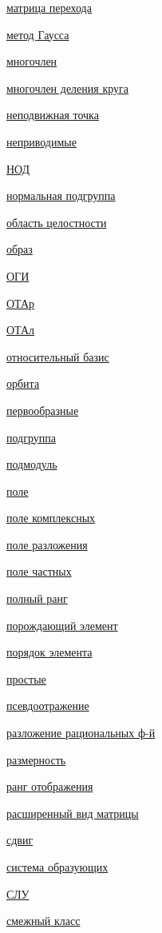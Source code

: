 \documentclass[a4paper,100pt]{article}
\theoremstyle{indented}
\theoremstyle{definition}
\theoremstyle{remark}
\begin{document}
\begin{multicols}{2}
    \hyperlink{n55}{матрица перехода}\

    \hyperlink{n60}{метод Гаусса}\

    \hyperlink{n27}{многочлен}\

    \hyperlink{n93}{многочлен деления круга}\

    \hyperlink{n72}{неподвижная точка}\

    \hyperlink{n7}{неприводимые}\

    \hyperlink{n6}{НОД}\

    \hyperlink{n87}{нормальная подгруппа}\

    \hyperlink{n2}{область целостности}\

    \hyperlink{n21}{образ}\

    \hyperlink{n10}{ОГИ}\

    \hyperlink{n13}{ОТАр}\

    \hyperlink{n40}{ОТАл}\

    \hyperlink{n52}{относительный базис}\

    \hyperlink{n82}{орбита}\

    \hyperlink{n92}{первообразные}\

    \hyperlink{n67}{подгруппа}\

    \hyperlink{n49}{подмодуль}\

    \hyperlink{n16}{поле}\

    \hyperlink{n38}{поле комплексных}\

    \hyperlink{n37}{поле разложения}\

    \hyperlink{n18}{поле частных}\

    \hyperlink{n56}{полный ранг}\

    \hyperlink{n71}{порождающий элемент}\

    \hyperlink{n69}{порядок элемента}\

    \hyperlink{n8}{простые}\ 

    \hyperlink{n58}{псевдоотражение}\

    \hyperlink{n41}{разложение рациональных ф-й}\

    \hyperlink{n47}{размерность}\

    \hyperlink{n53}{ранг отображения}\

    \hyperlink{n63}{расширенный вид матрицы}\

    \hyperlink{n79}{сдвиг}\

    \hyperlink{n44}{система образующих}\

    \hyperlink{n62}{СЛУ}\

    \hyperlink{n88}{смежный класс}\


\end{multicols}
\end{document}
